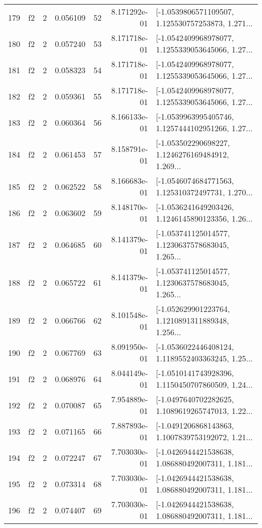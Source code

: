 \begin{tabular}{lllrlrl}
179 &  f2 &   2 &  0.056109 &   52 &  8.171292e-01 &  [-1.0539806571109507, 1.125530757253873, 1.271... \\
180 &  f2 &   2 &  0.057240 &   53 &  8.171718e-01 &  [-1.0542409968978077, 1.1255339053645066, 1.27... \\
181 &  f2 &   2 &  0.058323 &   54 &  8.171718e-01 &  [-1.0542409968978077, 1.1255339053645066, 1.27... \\
182 &  f2 &   2 &  0.059361 &   55 &  8.171718e-01 &  [-1.0542409968978077, 1.1255339053645066, 1.27... \\
183 &  f2 &   2 &  0.060364 &   56 &  8.166133e-01 &  [-1.0539963995405746, 1.1257444102951266, 1.27... \\
184 &  f2 &   2 &  0.061453 &   57 &  8.158791e-01 &  [-1.053502290698227, 1.1246276169484912, 1.269... \\
185 &  f2 &   2 &  0.062522 &   58 &  8.166683e-01 &  [-1.0546074684771563, 1.125310372497731, 1.270... \\
186 &  f2 &   2 &  0.063602 &   59 &  8.148170e-01 &  [-1.0536241649203426, 1.1246145890123356, 1.26... \\
187 &  f2 &   2 &  0.064685 &   60 &  8.141379e-01 &  [-1.053741125014577, 1.1230637578683045, 1.265... \\
188 &  f2 &   2 &  0.065722 &   61 &  8.141379e-01 &  [-1.053741125014577, 1.1230637578683045, 1.265... \\
189 &  f2 &   2 &  0.066766 &   62 &  8.101548e-01 &  [-1.052629901223764, 1.1210891311889348, 1.256... \\
190 &  f2 &   2 &  0.067769 &   63 &  8.091950e-01 &  [-1.0536022446408124, 1.1189552403363245, 1.25... \\
191 &  f2 &   2 &  0.068976 &   64 &  8.044149e-01 &  [-1.0510141743928396, 1.1150450707860509, 1.24... \\
192 &  f2 &   2 &  0.070087 &   65 &  7.954889e-01 &  [-1.0497640702282625, 1.1089619265747013, 1.22... \\
193 &  f2 &   2 &  0.071165 &   66 &  7.887893e-01 &  [-1.0491206868143863, 1.1007839753192072, 1.21... \\
194 &  f2 &   2 &  0.072247 &   67 &  7.703030e-01 &  [-1.0426944421538638, 1.086880492007311, 1.181... \\
195 &  f2 &   2 &  0.073314 &   68 &  7.703030e-01 &  [-1.0426944421538638, 1.086880492007311, 1.181... \\
196 &  f2 &   2 &  0.074407 &   69 &  7.703030e-01 &  [-1.0426944421538638, 1.086880492007311, 1.181... \\

\end{tabular}
